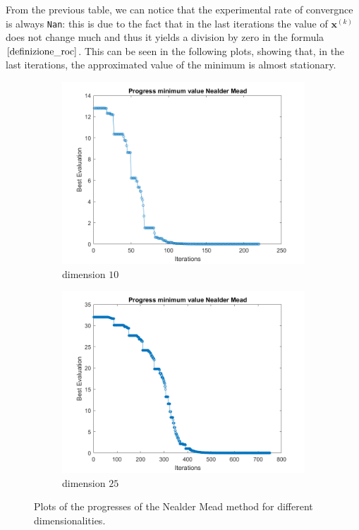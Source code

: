 From the previous table, we can notice that the experimental rate of convergnce is always \verb+Nan+: this is due to the fact that in the last iterations the value of $\mathbf{x}^{(k)}$ does not change much and thus it yields a division by zero in the formula $\eqref{definizione_roc}$.
This can be seen in the following plots, showing that, in the last iterations, the approximated value of the minimum is almost stationary.
\begin{figure}[htbp]
    \centering
    \begin{subfigure}[t]{0.35\textwidth}  %
        \centering
        \includegraphics[width=\textwidth]{img/pb76_SX_es10.png}
        \caption{dimension $10$}
        \label{fig:R6}
    \end{subfigure}
    \hspace{1cm} %
    \begin{subfigure}[t]{0.35\textwidth}
        \centering
        \includegraphics[width=\textwidth]{img/pb76_SX_es25.png}
        \caption{dimension $25$}
        \label{fig:R8}
    \end{subfigure}
    \caption{ \small Plots of the progresses of the Nealder Mead method for different dimensionalities.}
    \label{fig:overall}
\end{figure}


